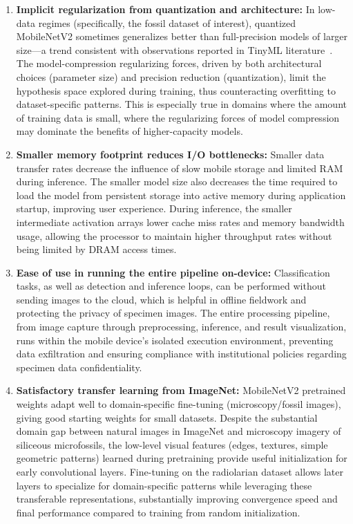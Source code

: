 \documentclass[a4paper,fleqn]{cas-sc}
\begin{document}
\begin{enumerate}
  \item \textbf {Implicit regularization from quantization and architecture:} In low-data regimes (specifically, the fossil dataset of interest), quantized MobileNetV2 sometimes generalizes better than full-precision models of larger size—a trend consistent with observations reported in TinyML literature~\cite{yaqoob2024tinyml}. The model-compression regularizing forces, driven by both architectural choices (parameter size) and precision reduction (quantization), limit the hypothesis space explored during training, thus counteracting overfitting to dataset-specific patterns. This is especially true in domains where the amount of training data is small, where the regularizing forces of model compression may dominate the benefits of higher-capacity models.
  \item \textbf{Smaller memory footprint reduces I/O bottlenecks:} Smaller data transfer rates decrease the influence of slow mobile storage and limited RAM during inference. The smaller model size also decreases the time required to load the model from persistent storage into active memory during application startup, improving user experience. During inference, the smaller intermediate activation arrays lower cache miss rates and memory bandwidth usage, allowing the processor to maintain higher throughput rates without being limited by DRAM access times.
  \item \textbf{Ease of use in running the entire pipeline on-device:} Classification tasks, as well as detection and inference loops, can be performed without sending images to the cloud, which is helpful in offline fieldwork and protecting the privacy of specimen images. The entire processing pipeline, from image capture through preprocessing, inference, and result visualization, runs within the mobile device's isolated execution environment, preventing data exfiltration and ensuring compliance with institutional policies regarding specimen data confidentiality.
  \item \textbf{Satisfactory transfer learning from ImageNet:} MobileNetV2 pretrained weights adapt well to domain-specific fine-tuning (microscopy/fossil images), giving good starting weights for small datasets. Despite the substantial domain gap between natural images in ImageNet and microscopy imagery of siliceous microfossils, the low-level visual features (edges, textures, simple geometric patterns) learned during pretraining provide useful initialization for early convolutional layers. Fine-tuning on the radiolarian dataset allows later layers to specialize for domain-specific patterns while leveraging these transferable representations, substantially improving convergence speed and final performance compared to training from random initialization. ~\cite{sandler2018mobilenetv2,liu2023patch}
\end{enumerate}
\end{document}
